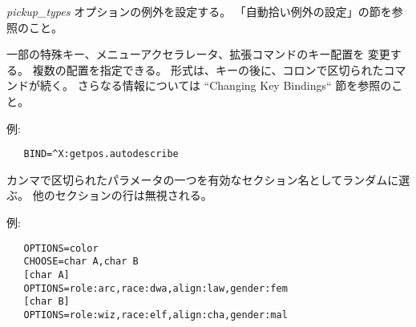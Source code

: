 \item[\bb{AUTOPICKUP\_EXCEPTION}]
{{\it pickup\_types\/}} オプションの例外を設定する。
「自動拾い例外の設定」の節を参照のこと。
\item[\bb{BINDINGS}]
一部の特殊キー、メニューアクセラレータ、拡張コマンドのキー配置を
変更する。
複数の配置を指定できる。
形式は、キーの後に、コロンで区切られたコマンドが続く。
さらなる情報については ``Changing Key Bindings`` 節を参照のこと。

例:
\begin{verbatim}
   BIND=^X:getpos.autodescribe
\end{verbatim}

\item[\bb{CHOOSE}]
カンマで区切られたパラメータの一つを有効なセクション名としてランダムに選ぶ。
他のセクションの行は無視される。

例:
\begin{verbatim}
   OPTIONS=color
   CHOOSE=char A,char B
   [char A]
   OPTIONS=role:arc,race:dwa,align:law,gender:fem
   [char B]
   OPTIONS=role:wiz,race:elf,align:cha,gender:mal
\end{verbatim}

